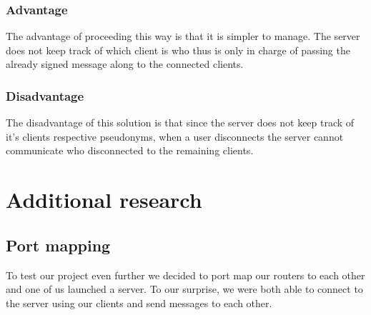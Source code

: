 \documentclass{article}
\begin{document}
\subsubsection{Advantage}
The advantage of proceeding this way is that it is simpler to manage. The server does not keep track of which client is who thus is only in charge of passing the already signed message along to the connected clients.
\subsubsection{Disadvantage}
The disadvantage of this solution is that since the server does not keep track of it's clients respective pseudonyms, when a user disconnects the server cannot communicate who disconnected to the remaining clients.

\section{Additional research}

\subsection{Port mapping}
To test our project even further we decided to port map our routers to each other and one of us launched a server. To our surprise, we were both able to connect to the server using our clients and send messages to each other.
\end{document}
